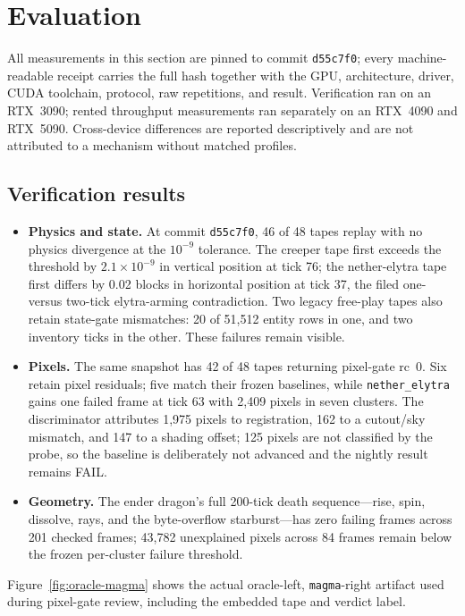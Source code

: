 \documentclass[11pt]{article}
\begin{document}
\section{Evaluation}
\label{sec:eval}

All measurements in this section are pinned to commit \texttt{d55c7f0}; every machine-readable receipt carries the full hash together with the GPU, architecture, driver, CUDA toolchain, protocol, raw repetitions, and result. Verification ran on an RTX~3090; rented throughput measurements ran separately on an RTX~4090 and RTX~5090. Cross-device differences are reported descriptively and are not attributed to a mechanism without matched profiles.

\subsection{Verification results}
\label{sec:eval-verify}

\begin{itemize}
\item \textbf{Physics and state.} At commit \texttt{d55c7f0}, 46 of 48 tapes replay with no physics divergence at the $10^{-9}$ tolerance. The creeper tape first exceeds the threshold by $2.1\times10^{-9}$ in vertical position at tick 76; the nether-elytra tape first differs by 0.02 blocks in horizontal position at tick 37, the filed one- versus two-tick elytra-arming contradiction. Two legacy free-play tapes also retain state-gate mismatches: 20 of 51{,}512 entity rows in one, and two inventory ticks in the other. These failures remain visible.
\item \textbf{Pixels.} The same snapshot has 42 of 48 tapes returning pixel-gate rc~0. Six retain pixel residuals; five match their frozen baselines, while \texttt{nether\_elytra} gains one failed frame at tick 63 with 2{,}409 pixels in seven clusters. The discriminator attributes 1{,}975 pixels to registration, 162 to a cutout/sky mismatch, and 147 to a shading offset; 125 pixels are not classified by the probe, so the baseline is deliberately not advanced and the nightly result remains FAIL.
\item \textbf{Geometry.} The ender dragon's full 200-tick death sequence---rise, spin, dissolve, rays, and the byte-overflow starburst---has zero failing frames across 201 checked frames; 43{,}782 unexplained pixels across 84 frames remain below the frozen per-cluster failure threshold.
\end{itemize}

Figure~\ref{fig:oracle-magma} shows the actual oracle-left, \texttt{magma}-right artifact used during pixel-gate review, including the embedded tape and verdict label.
\end{document}

